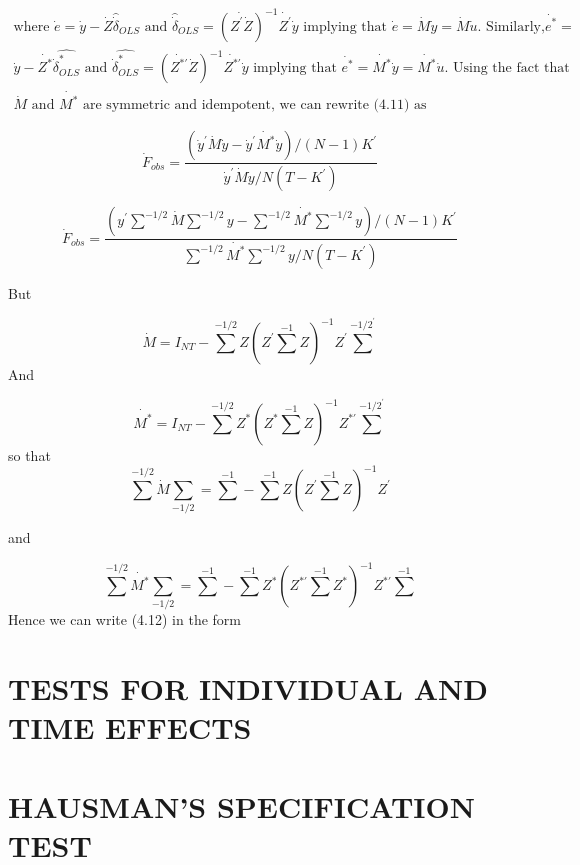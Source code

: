 \documentclass[
]{book}
\begin{document}
\[
\begin{aligned}
\text{where  } \dot{e}=\dot{y}-\dot{Z} \widehat{\dot{\delta}}_{OLS}  
 \text{ and } \widehat{\dot{\delta}}_{OLS} =\left(\dot{Z^{\prime}\dot{Z}} \right)^{-1} \dot{Z^{\prime}} \dot{y}  \text{ implying that } \dot{e}=\dot{M}\dot{y}=\dot{M}\dot{u} \text{.   Similarly,}   \dot{e^*}= \\ \dot{y}-\dot{Z^*}\widehat{\dot{\delta}_{OLS}^*} \text{ and } \widehat{\dot{\delta}_{OLS}^*}=\left(\dot{Z^{* \prime}} \dot{Z} \right)^{-1} \dot{Z^{* \prime}} \dot{y} \text{ implying that }  \dot{e^*}=\dot{M^*}\dot{y}= \dot{M^*} \dot{u} \text{. Using the fact that } \\ \dot{M} \text{ and } \dot{M^*} \text{ are symmetric and idempotent, we can rewrite (4.11) as } 
 \end{aligned}
 \]

\[
\dot{F}_{obs}=  \frac{\left(\dot{y}^{\prime}\dot{M}\dot{y}-\dot{y}^{\prime}\dot{M^*} \dot{y} \right) / \left(N-1\right) K^{\prime} } 
 {\dot{y}^{\prime}\dot{M}\dot{y} / N \left( T-K^{\prime} \right)    }\]

\begin{equation}
 \dot{F}_{obs}=\frac{   \left(y^{\prime} \sum^{-1/2}\dot{M} \sum^{-1/2}y -\sum^{-1/2}\dot{M^*} \sum^{-1/2}y \right) / \left(N-1\right) K^{\prime}  }
{ \sum^{-1/2}\dot{M^*} \sum^{-1/2}y  / N \left(T-K^{\prime} \right)  }
\end{equation}

But

\[ \dot{M}=I_{NT}-\sum^{-1/2} Z\left(Z^{\prime } \sum^{-1} Z \right)^{-1} Z^{\prime} \sum^{-1/2^{\prime}} \]
And

\[ \dot{M^*}=I_{NT}-\sum^{-1/2} Z^{*}\left(Z^{*} \sum^{-1} Z \right)^{-1} Z^{* \prime} \sum^{-1/2^{\prime}} \]
so that
\[\sum^{-1/2}\dot{M}\sum_{-1/2} =\sum^{-1}-\sum^{-1} Z \left(Z^{\prime}\sum^{-1}Z  \right)^{-1} Z^{\prime} \]

and

\[\sum^{-1/2}\dot{M^*}\sum_{-1/2} =\sum^{-1}-\sum^{-1} Z^* \left(Z^{*\prime}\sum^{-1}Z^*  \right)^{-1} Z^{*\prime} \sum^{-1} \]
Hence we can write (4.12) in the form

\hypertarget{tests-for-individual-and-time-effects}{%
\section{TESTS FOR INDIVIDUAL AND TIME EFFECTS}\label{tests-for-individual-and-time-effects}}

\hypertarget{hausmans-specification-test}{%
\section{HAUSMAN'S SPECIFICATION TEST}\label{hausmans-specification-test}}
\end{document}
